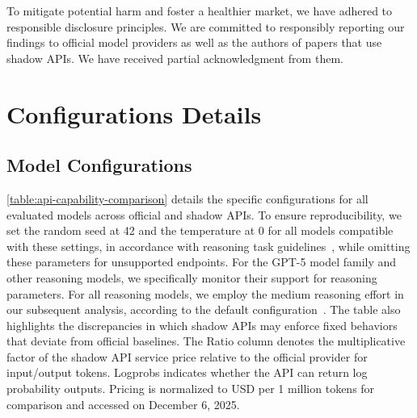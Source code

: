 \documentclass[letterpaper,twocolumn,10pt]{article}
\begin{document}
To mitigate potential harm and foster a healthier market, we have adhered to responsible disclosure principles. 
We are committed to responsibly reporting our findings to official model providers as well as the authors of papers that use shadow APIs. 
We have received partial acknowledgment from them.

\newpage

% 


% 


\appendix


\section{Configurations Details}
\label{appendix:configurations_detail}

\subsection{Model Configurations}
\label{appendix:model_configurations}

\autoref{table:api-capability-comparison} details the specific configurations for all evaluated models across official and shadow APIs.
To ensure reproducibility, we set the random seed at 42 and the temperature at 0 for all models compatible with these settings, in accordance with reasoning task guidelines~\cite{D251}, while omitting these parameters for unsupported endpoints.
For the GPT-5 model family and other reasoning models, we specifically monitor their support for reasoning parameters.
For all reasoning models, we employ the medium reasoning effort in our subsequent analysis, according to the default configuration~\cite{O25}.
The table also highlights the discrepancies in which shadow APIs may enforce fixed behaviors that deviate from official baselines.
The Ratio column denotes the multiplicative factor of the shadow API service price relative to the official provider for input/output tokens.
Logprobs indicates whether the API can return log probability outputs. 
Pricing is normalized to USD per 1 million tokens for comparison and accessed on December 6, 2025.
\end{document}
